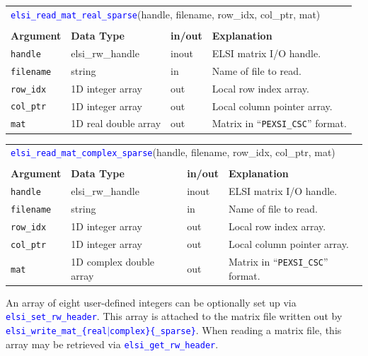 \documentclass{report}
\newcommand{\api}[1]{\textcolor{blue}{\texttt{#1}}}
\begin{document}
\begin{tabular}[]{|p{20mm}|p{40mm}|p{10mm}|p{92mm}|}
\multicolumn{4}{l}{\api{elsi\_read\_mat\_real\_sparse}(handle, filename, row\_idx, col\_ptr, mat)}\\
\multicolumn{4}{l}{}\\
\hline
\multicolumn{1}{|l|}{\textbf{Argument}} & \multicolumn{1}{l|}{\textbf{Data Type}} & \multicolumn{1}{l|}{\textbf{in/out}} & \multicolumn{1}{l|}{\textbf{Explanation}}\\
\hline
\texttt{handle}   & elsi\_rw\_handle     & inout & ELSI matrix I/O handle.\\
\hline
\texttt{filename} & string               & in    & Name of file to read.\\
\hline
\texttt{row\_idx} & 1D integer array     & out   & Local row index array.\\
\hline
\texttt{col\_ptr} & 1D integer array     & out   & Local column pointer array.\\
\hline
\texttt{mat}      & 1D real double array & out   & Matrix in ``\texttt{PEXSI\_CSC}'' format.\\
\hline
\end{tabular}

\begin{tabular}[]{|p{20mm}|p{40mm}|p{10mm}|p{92mm}|}
\multicolumn{4}{l}{\api{elsi\_read\_mat\_complex\_sparse}(handle, filename, row\_idx, col\_ptr, mat)}\\
\multicolumn{4}{l}{}\\
\hline
\multicolumn{1}{|l|}{\textbf{Argument}} & \multicolumn{1}{l|}{\textbf{Data Type}} & \multicolumn{1}{l|}{\textbf{in/out}} & \multicolumn{1}{l|}{\textbf{Explanation}}\\
\hline
\texttt{handle}   & elsi\_rw\_handle        & inout & ELSI matrix I/O handle.\\
\hline
\texttt{filename} & string                  & in    & Name of file to read.\\
\hline
\texttt{row\_idx} & 1D integer array        & out   & Local row index array.\\
\hline
\texttt{col\_ptr} & 1D integer array        & out   & Local column pointer array.\\
\hline
\texttt{mat}      & 1D complex double array & out   & Matrix in ``\texttt{PEXSI\_CSC}'' format.\\
\hline
\end{tabular}

An array of eight user-defined integers can be optionally set up via \api{elsi\_set\_rw\_header}. This array is attached to the matrix file written out by \api{elsi\_write\_mat\_\{real$\vert$complex\}\{\_sparse\}}. When reading a matrix file, this array may be retrieved via \api{elsi\_get\_rw\_header}.
\end{document}
